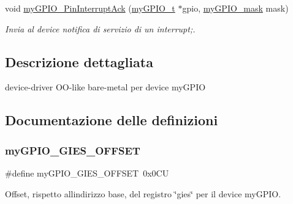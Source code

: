 \begin{DoxyCompactItemize}
void \hyperlink{group__bare-metal_gab6ad3dda867515825890c97dbf6f55db}{my\+G\+P\+I\+O\+\_\+\+Pin\+Interrupt\+Ack} (\hyperlink{structmy_g_p_i_o__t}{my\+G\+P\+I\+O\+\_\+t} $\ast$gpio, \hyperlink{group__bare-metal_ga402a0d20afc0cb7c25554b8b023f4253}{my\+G\+P\+I\+O\+\_\+mask} mask)
\begin{DoxyCompactList}\small\item\em Invia al device notifica di servizio di un interrupt;. \end{DoxyCompactList}\end{DoxyCompactItemize}


\subsection{Descrizione dettagliata}
device-\/driver O\+O-\/like bare-\/metal per device my\+G\+P\+IO 



\subsection{Documentazione delle definizioni}
\mbox{\label{group__bare-metal_gad251e4d87d464525d4a2858977468994}} 
\subsubsection{\texorpdfstring{my\+G\+P\+I\+O\+\_\+\+G\+I\+E\+S\+\_\+\+O\+F\+F\+S\+ET}{myGPIO\_GIES\_OFFSET}}
{\footnotesize\ttfamily \#define my\+G\+P\+I\+O\+\_\+\+G\+I\+E\+S\+\_\+\+O\+F\+F\+S\+ET~0x0\+CU}



Offset, rispetto all\textquotesingle{}indirizzo base, del registro \char`\"{}gies\char`\"{} per il device my\+G\+P\+IO. 

\mbox{\label{group__bare-metal_gadfca866ac50c2dae09c3c46ad80670fc}} 
